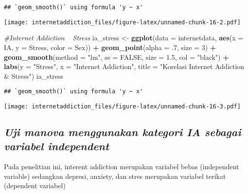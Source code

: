 \documentclass[
]{article}
\newenvironment{Shaded}{\begin{snugshade}}{\end{snugshade}}
\newcommand{\CommentTok}[1]{\textcolor[rgb]{0.56,0.35,0.01}{\textit{#1}}}
\newcommand{\DataTypeTok}[1]{\textcolor[rgb]{0.13,0.29,0.53}{#1}}
\newcommand{\DecValTok}[1]{\textcolor[rgb]{0.00,0.00,0.81}{#1}}
\newcommand{\FloatTok}[1]{\textcolor[rgb]{0.00,0.00,0.81}{#1}}
\newcommand{\KeywordTok}[1]{\textcolor[rgb]{0.13,0.29,0.53}{\textbf{#1}}}
\newcommand{\NormalTok}[1]{#1}
\newcommand{\OperatorTok}[1]{\textcolor[rgb]{0.81,0.36,0.00}{\textbf{#1}}}
\newcommand{\OtherTok}[1]{\textcolor[rgb]{0.56,0.35,0.01}{#1}}
\newcommand{\StringTok}[1]{\textcolor[rgb]{0.31,0.60,0.02}{#1}}
\begin{document}
\begin{verbatim}
## `geom_smooth()` using formula 'y ~ x'
\end{verbatim}

\texttt{[image: internetaddiction\_files/figure-latex/unnamed-chunk-16-2.pdf]}

\begin{Shaded}
\begin{Highlighting}[]
\CommentTok{#Internet Addiction ~ Stress }
\NormalTok{ia_stress <-}\StringTok{ }\KeywordTok{ggplot}\NormalTok{(}\DataTypeTok{data =}\NormalTok{ internetdata, }
                    \KeywordTok{aes}\NormalTok{(}\DataTypeTok{x =}\NormalTok{ IA, }
                        \DataTypeTok{y =}\NormalTok{ Stress,}
                        \DataTypeTok{color =}\NormalTok{ Sex)) }\OperatorTok{+}
\StringTok{  }\KeywordTok{geom_point}\NormalTok{(}\DataTypeTok{alpha =} \FloatTok{.7}\NormalTok{,}
             \DataTypeTok{size =} \DecValTok{3}\NormalTok{) }\OperatorTok{+}
\StringTok{  }\KeywordTok{geom_smooth}\NormalTok{(}\DataTypeTok{method =} \StringTok{"lm"}\NormalTok{, }
              \DataTypeTok{se =} \OtherTok{FALSE}\NormalTok{,}
              \DataTypeTok{size =} \FloatTok{1.5}\NormalTok{,}
              \DataTypeTok{col =} \StringTok{"black"}\NormalTok{) }\OperatorTok{+}
\StringTok{  }\KeywordTok{labs}\NormalTok{(}\DataTypeTok{y =} \StringTok{"Stress"}\NormalTok{,}
       \DataTypeTok{x =} \StringTok{"Internet Addiction"}\NormalTok{, }
       \DataTypeTok{title =} \StringTok{"Korelasi Internet Addiction & Stress"}\NormalTok{) }
\NormalTok{ia_stress}
\end{Highlighting}
\end{Shaded}

\begin{verbatim}
## `geom_smooth()` using formula 'y ~ x'
\end{verbatim}

\texttt{[image: internetaddiction\_files/figure-latex/unnamed-chunk-16-3.pdf]}

\hypertarget{uji-manova-menggunakan-kategori-ia-sebagai-variabel-independent}{%
\subsection{\texorpdfstring{\emph{Uji manova menggunakan kategori IA
sebagai variabel
independent}}{Uji manova menggunakan kategori IA sebagai variabel independent}}\label{uji-manova-menggunakan-kategori-ia-sebagai-variabel-independent}}

Pada penelitian ini, interent addiction merupakan variabel bebas
(independent variable) sedangkan depresi, anxiety, dan stres merupakan
variabel terikat (dependent variabel)
\end{document}
